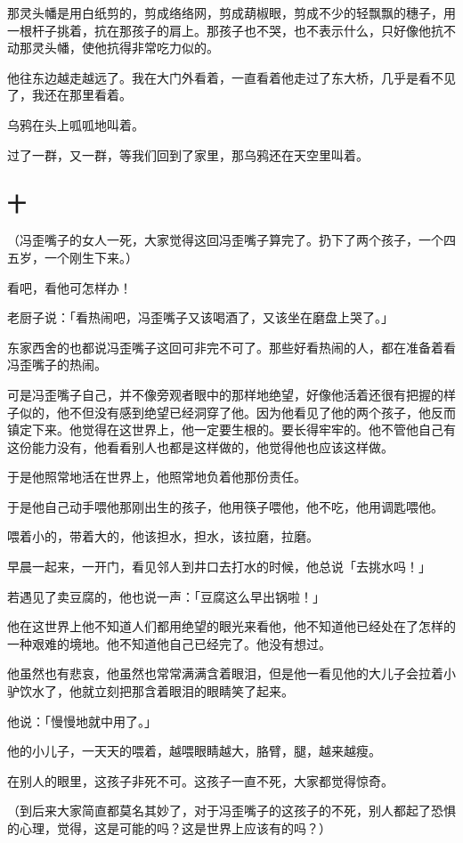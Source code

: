 \documentclass[UTF8]{ctexart}
\begin{document}
那灵头幡是用白纸剪的，剪成络络网，剪成葫椒眼，剪成不少的轻飘飘的穗子，用一根杆子挑着，抗在那孩子的肩上。那孩子也不哭，也不表示什么，只好像他抗不动那灵头幡，使他抗得非常吃力似的。

他往东边越走越远了。我在大门外看着，一直看着他走过了东大桥，几乎是看不见了，我还在那里看着。

乌鸦在头上呱呱地叫着。

过了一群，又一群，等我们回到了家里，那乌鸦还在天空里叫着。

\subsection{十}

（冯歪嘴子的女人一死，大家觉得这回冯歪嘴子算完了。扔下了两个孩子，一个四五岁，一个刚生下来。）

看吧，看他可怎样办！

老厨子说：「看热闹吧，冯歪嘴子又该喝酒了，又该坐在磨盘上哭了。」

东家西舍的也都说冯歪嘴子这回可非完不可了。那些好看热闹的人，都在准备着看冯歪嘴子的热闹。

可是冯歪嘴子自己，并不像旁观者眼中的那样地绝望，好像他活着还很有把握的样子似的，他不但没有感到绝望已经洞穿了他。因为他看见了他的两个孩子，他反而镇定下来。他觉得在这世界上，他一定要生根的。要长得牢牢的。他不管他自己有这份能力没有，他看看别人也都是这样做的，他觉得他也应该这样做。

于是他照常地活在世界上，他照常地负着他那份责任。

于是他自己动手喂他那刚出生的孩子，他用筷子喂他，他不吃，他用调匙喂他。

喂着小的，带着大的，他该担水，担水，该拉磨，拉磨。

早晨一起来，一开门，看见邻人到井口去打水的时候，他总说「去挑水吗！」

若遇见了卖豆腐的，他也说一声：「豆腐这么早出锅啦！」

他在这世界上他不知道人们都用绝望的眼光来看他，他不知道他已经处在了怎样的一种艰难的境地。他不知道他自己已经完了。他没有想过。

他虽然也有悲哀，他虽然也常常满满含着眼泪，但是他一看见他的大儿子会拉着小驴饮水了，他就立刻把那含着眼泪的眼睛笑了起来。

他说：「慢慢地就中用了。」

他的小儿子，一天天的喂着，越喂眼睛越大，胳臂，腿，越来越瘦。

在别人的眼里，这孩子非死不可。这孩子一直不死，大家都觉得惊奇。

（到后来大家简直都莫名其妙了，对于冯歪嘴子的这孩子的不死，别人都起了恐惧的心理，觉得，这是可能的吗？这是世界上应该有的吗？）
\end{document}

